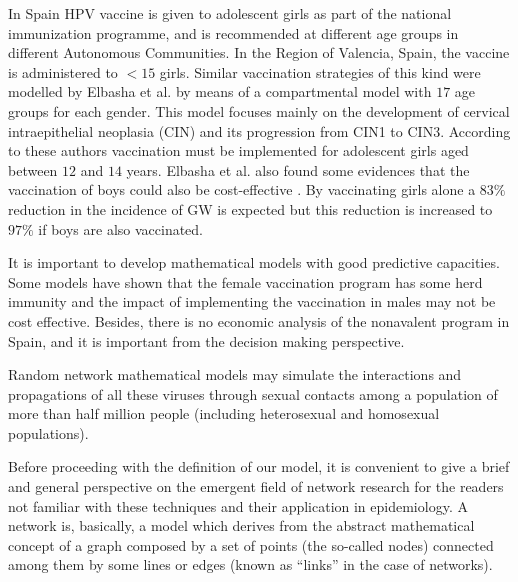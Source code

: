 In Spain HPV vaccine is given to adolescent girls as part of the national immunization programme, and is recommended at different age groups in different Autonomous Communities.
In the Region of Valencia, Spain, the vaccine is administered to $< 15$ girls. Similar vaccination strategies of this kind were modelled by Elbasha et al. \cite{elbasha2007model,elbasha2005vaccination} by means of a compartmental model with $17$ age groups for each gender. This model focuses mainly on the development of cervical intraepithelial neoplasia (CIN) and its progression from CIN1 to CIN3. According to these authors vaccination must be implemented for adolescent girls aged between $12$ and $14$ years. Elbasha et al. also found some evidences that the vaccination of boys could also be cost-effective \cite{elbasha2007model}. By vaccinating girls alone a $83\%$ reduction in the incidence of GW is expected but this reduction is increased to $97\%$ if boys are also vaccinated.

It is important to develop mathematical models with good predictive capacities. Some models have shown that the female vaccination program has some herd immunity and the impact of implementing the vaccination in males may not be cost effective. Besides, there is no economic analysis of the nonavalent program in Spain, and it is important from the decision making perspective.

Random network mathematical models may simulate the interactions and propagations of all these viruses through sexual contacts among a population of more than half million people (including heterosexual and homosexual populations). 

Before proceeding with the definition of our model, it is convenient to give a brief and general perspective on the emergent field of network research for the readers not familiar with these techniques and their application in epidemiology. A network is, basically, a model which derives from the abstract mathematical concept of a graph composed by a set of points (the so-called nodes) connected among them by some lines or edges (known as ``links'' in the case of networks).

